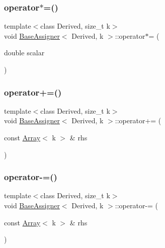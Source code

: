 \mbox{\label{structBaseAssigner_a2c2f28fd070798b3355b246add7385cc}} 
\subsubsection{\texorpdfstring{operator$\ast$=()}{operator*=()}}
{\footnotesize\ttfamily template$<$class Derived, size\+\_\+t k$>$ \\
void \hyperlink{structBaseAssigner}{Base\+Assigner}$<$ Derived, k $>$\+::operator$\ast$= (\begin{DoxyParamCaption}\item[{double}]{scalar }\end{DoxyParamCaption})\hspace{0.3cm}{\ttfamily [inline]}}

\mbox{\label{structBaseAssigner_a52971385a3a0e57e69e3cee3f7ad558a}} 
\subsubsection{\texorpdfstring{operator+=()}{operator+=()}}
{\footnotesize\ttfamily template$<$class Derived, size\+\_\+t k$>$ \\
void \hyperlink{structBaseAssigner}{Base\+Assigner}$<$ Derived, k $>$\+::operator+= (\begin{DoxyParamCaption}\item[{const \hyperlink{Includes_8h_abd9de33944f934950000c3929e14ad8d}{Array}$<$ k $>$ \&}]{rhs }\end{DoxyParamCaption})\hspace{0.3cm}{\ttfamily [inline]}}

\mbox{\label{structBaseAssigner_ac0129fea47a3cb94d72abb0461445dfe}} 
\subsubsection{\texorpdfstring{operator-\/=()}{operator-=()}}
{\footnotesize\ttfamily template$<$class Derived, size\+\_\+t k$>$ \\
void \hyperlink{structBaseAssigner}{Base\+Assigner}$<$ Derived, k $>$\+::operator-\/= (\begin{DoxyParamCaption}\item[{const \hyperlink{Includes_8h_abd9de33944f934950000c3929e14ad8d}{Array}$<$ k $>$ \&}]{rhs }\end{DoxyParamCaption})\hspace{0.3cm}{\ttfamily [inline]}}

